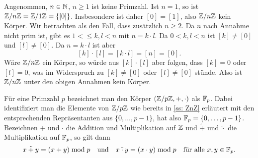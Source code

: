 Angenommen, $n \in \mathbb{N}$, $n \geq 1$ ist keine Primzahl. Ist $n = 1$, so ist $\mathbb{Z}/n\mathbb{Z} = \mathbb{Z}/1\mathbb{Z} = \{[0]\}$. Insbesondere ist daher $[0] = [1]$, also $\mathbb{Z}/n\mathbb{Z}$ kein Körper. Wir betrachten als den Fall, dass zusätzlich $n \geq 2$. Da $n$ nach Annahme nicht prim ist, gibt es $1 < \leq k,l < n$ mit $n = k \cdot l$. Da $0 < k,l < n$ ist $[k] \neq [0]$ und $[l] \neq [0]$. Da $n = k \cdot l$ ist aber
\[
 [k] \cdot [l]
 = [k \cdot l]
 = [n]
 = [0].
\]
Wäre $\mathbb{Z}/n\mathbb{Z}$ ein Körper, so würde aus $[k] \cdot [l]$ aber folgen, dass $[k] = 0$ oder $[l] = 0$, was im Widerspruch zu $[k] \neq [0]$ oder $[l] \neq [0]$ stünde. Also ist $\mathbb{Z}/n\mathbb{Z}$ unter den obigen Annahmen kein Körper.

Für eine Primzahl $p$ bezeichnet man den Körper $(\mathbb{Z}/p\mathbb{Z}, +, \cdot)$ als $\mathbb{F}_p$. Dabei identifiziert man die Elemente von $\mathbb{Z}/p\mathbb{Z}$ wie bereits in \ref{ss: ZnZ} erläutert mit den entsprechenden Repräsentanten aus $\{0, \dotsc, p-1\}$, hat also $\mathbb{F}_p = \{0, \dotsc, p-1\}$. Bezeichnen $+$ und $\cdot$ die Addition und Multiplikation auf $\mathbb{Z}$ und $\tilde{+}$ und $\tilde{\cdot}$ die Multiplikation auf $\mathbb{F}_p$, so gilt dann
\[
 x \mathbin{\tilde{+}} y = (x + y) \bmod p
 \quad\text{und}\quad
 x \mathbin{\tilde{\cdot}} y = (x \cdot y) \bmod p
 \quad
 \text{für alle $x,y \in \mathbb{F}_p$}.
\]



